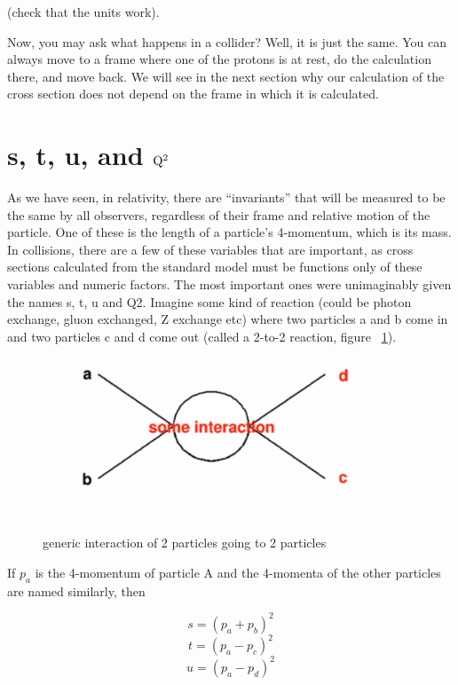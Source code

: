 (check that the units work).

Now, you may ask what happens in a collider?  Well, it is just the same.  You can always move to a frame where one of the protons is at rest, do the calculation there, and move back.  We will see in the next section why our calculation of the cross section does not depend on the frame in which it is calculated.

\section{s, t, u, and ${\rm Q^2}$}

As we have seen, in relativity, there are ``invariants'' that will be 
measured to be the same by all observers, regardless of 
their frame and relative motion of the particle.  One of these is the length of a particle's 
4-momentum, which is its mass.  In collisions, there are a few of these variables that are important, as cross sections calculated from the standard model must be functions only of these variables and numeric factors.  The most important ones were unimaginably given the names s, t, u and Q2.  Imagine some kind of reaction (could be photon exchange, gluon exchanged, Z exchange etc) where two particles a and b come in and two particles c and d come out  (called a 2-to-2 reaction, figure ~\ref{fig:twototwo}).

\begin{figure}[h]
\centering\includegraphics[scale=0.5]{./protonprotoncollisions/Pictures/fig1.pdf}
\caption{generic interaction of 2 particles going to 2 particles}
\label{fig:twototwo}
\end{figure}

If \(p_{a}\) is the 4-momentum of particle A and the 4-momenta of the other particles are named similarly, then

\begin{equation}s=(p_{a}+p_{b})^{2}\end{equation}
\begin{equation}t=(p_{a}-p_{c})^{2}\end{equation}
\begin{equation}u=(p_{a}-p_{d})^{2}\end{equation}

